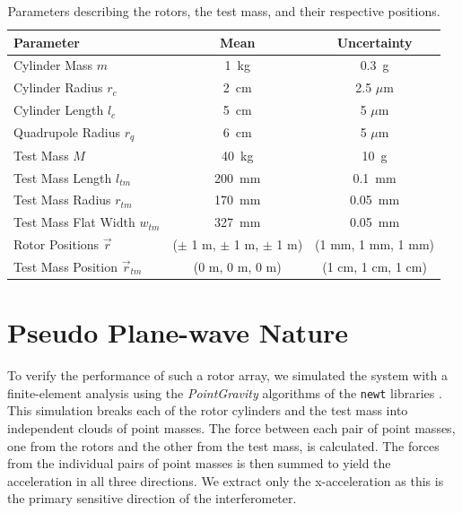 \documentclass[superscriptaddress, twocolumn, prd]{revtex4-1}
\begin{document}
\begin{widetext}
\begingroup
\setlength{\tabcolsep}{10pt} %
\renewcommand{\arraystretch}{1.5} %

\begin{table}[h!]
\begin{center}
\begin{tabular}{ |l|c|c| }
\hline
 Parameter & Mean & Uncertainty \\
 \hline
Cylinder Mass $m$ & 1~kg & 0.3~g \\
Cylinder Radius $r_c$& 2~cm & 2.5 $\mu$m \\
Cylinder Length $l_c$& 5~cm & 5 $\mu$m \\
Quadrupole Radius $r_{q}$ & 6~cm & 5 $\mu$m \\
Test Mass $M$ & 40~kg & 10~g \\
Test Mass Length $l_{tm}$& 200~mm & 0.1~mm\\
Test Mass Radius $r_{tm}$& 170~mm & 0.05~mm\\
Test Mass Flat Width $w_{tm}$& 327~mm & 0.05~mm\\
Rotor Positions $\vec{r}$& ($\pm$ 1 m, $\pm$ 1 m, $\pm$ 1 m) & (1 mm, 1 mm, 1 mm) \\
Test Mass Position $\vec{r}_{tm}$& (0 m, 0 m, 0 m) & (1 cm, 1 cm, 1 cm) \\
 \hline

 \end{tabular}
 \caption{Parameters describing the rotors, the test mass, and their respective positions.}\label{param}
 \end{center}

\end{table}
\endgroup
\end{widetext}

\section{Pseudo Plane-wave Nature}

To verify the performance of such a rotor array, we simulated the system with a finite-element analysis using the \textit{PointGravity} algorithms of the \texttt{newt} libraries \cite{Hagedorn, pgURL}. This simulation breaks each of the rotor cylinders and the test mass into independent clouds of point masses. The force between each pair of point masses, one from the rotors and the other from the test mass, is calculated. The forces from the individual pairs of point masses is then summed to yield the acceleration in all three directions. We extract only the x-acceleration as this is the primary sensitive direction of the interferometer.
\end{document}
